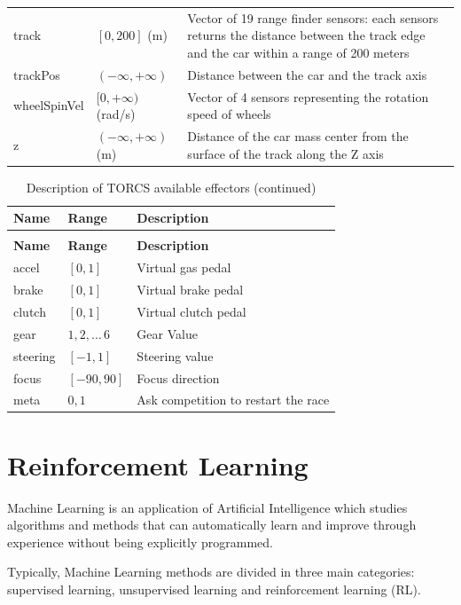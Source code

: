 \documentclass[Lau,oneside,noexaminfo]{sapthesis} %
\begin{document}
\begin{longtable}{p{}p{}p{}}
track         & $[0, 200]$ (m)      & Vector of 19 range finder sensors: each sensors returns the distance between the track edge and the car within a range of 200 meters \\
trackPos      & $(-\infty, +\infty)$          & Distance between the car and the track axis      \\
wheelSpinVel  & $[0, +\infty)$ (rad/s)  & Vector of 4 sensors representing the rotation speed of wheels \\
z             & $(-\infty, +\infty)$ (m)      & Distance of the car mass center from the surface of the track along the Z axis \\
\end{longtable}
\begin{longtable}{p{}p{}p{}}
\caption{Description of TORCS available effectors}\\
\toprule
\textbf{Name}          & \textbf{Range}            & \textbf{Description}    \\
\midrule
\endfirsthead
\caption{Description of TORCS available effectors (continued)}\\
\toprule
\textbf{Name}          & \textbf{Range}            & \textbf{Description}    \\
\midrule
\endhead
\bottomrule
\endfoot
accel         & $[0, 1]$  & Virtual gas pedal       \\
brake         & $[0, 1]$  & Virtual brake pedal \\
clutch        & $[0, 1]$  & Virtual clutch pedal    \\
gear    & ${1, 2, \dots\, 6}$      & Gear Value \\
steering        & $[-1, 1]$  & Steering value    \\
focus    & $[-90, 90]$     & Focus direction \\
meta        & ${0, 1}$  & Ask competition to restart the race    \\
\end{longtable}

\chapter{Reinforcement Learning}
Machine Learning is an application of Artificial Intelligence which studies algorithms and methods that can automatically learn and improve through experience without being explicitly programmed. 

Typically, Machine Learning methods are divided in three main categories: supervised learning, unsupervised learning and reinforcement learning (RL). 
\end{document}

